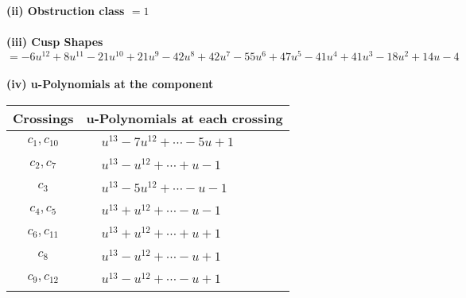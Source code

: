 \documentclass[1p]{elsarticle_modified}
\theoremstyle{definition}
\begin{document}
\flushleft \textbf{(ii) Obstruction class $= 1$}\\~\\
\flushleft \textbf{(iii) Cusp Shapes $= -6 u^{12}+8 u^{11}-21 u^{10}+21 u^9-42 u^8+42 u^7-55 u^6+47 u^5-41 u^4+41 u^3-18 u^2+14 u-4$}\\~\\
\newpage\renewcommand{\arraystretch}{1}
\flushleft \textbf{(iv) u-Polynomials at the component}\newline \\
\begin{tabular}{m{50pt}|m{274pt}}
Crossings & \hspace{64pt}u-Polynomials at each crossing \\
\hline $$\begin{aligned}c_{1},c_{10}\end{aligned}$$&$\begin{aligned}
&u^{13}-7 u^{12}+\cdots-5 u+1
\end{aligned}$\\
\hline $$\begin{aligned}c_{2},c_{7}\end{aligned}$$&$\begin{aligned}
&u^{13}- u^{12}+\cdots+u-1
\end{aligned}$\\
\hline $$\begin{aligned}c_{3}\end{aligned}$$&$\begin{aligned}
&u^{13}-5 u^{12}+\cdots- u-1
\end{aligned}$\\
\hline $$\begin{aligned}c_{4},c_{5}\end{aligned}$$&$\begin{aligned}
&u^{13}+u^{12}+\cdots- u-1
\end{aligned}$\\
\hline $$\begin{aligned}c_{6},c_{11}\end{aligned}$$&$\begin{aligned}
&u^{13}+u^{12}+\cdots+u+1
\end{aligned}$\\
\hline $$\begin{aligned}c_{8}\end{aligned}$$&$\begin{aligned}
&u^{13}- u^{12}+\cdots- u+1
\end{aligned}$\\
\hline $$\begin{aligned}c_{9},c_{12}\end{aligned}$$&$\begin{aligned}
&u^{13}- u^{12}+\cdots- u+1
\end{aligned}$\\
\hline
\end{tabular}\\~\\
\end{document}
